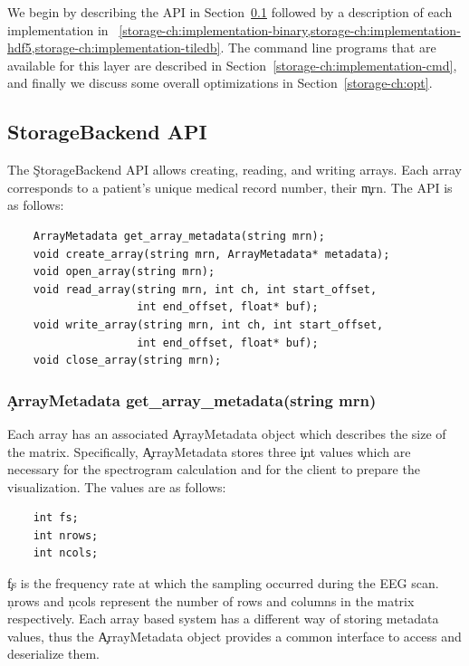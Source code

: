 We begin by describing the API in Section~\ref{storage-ch:api} followed by a
description of each implementation in
~\cref{storage-ch:implementation-binary,storage-ch:implementation-hdf5,storage-ch:implementation-tiledb}.
The command line programs that are available for this layer are described in
Section~\ref{storage-ch:implementation-cmd}, and finally we discuss some
overall optimizations in Section~\ref{storage-ch:opt}.

\subsection{StorageBackend API}\label{storage-ch:api}

The \c{StorageBackend} API allows creating, reading, and writing arrays. Each
array corresponds to a patient's unique medical record number, their \c{mrn}.
The API is as follows:

\begin{lstlisting}
    ArrayMetadata get_array_metadata(string mrn);
    void create_array(string mrn, ArrayMetadata* metadata);
    void open_array(string mrn);
    void read_array(string mrn, int ch, int start_offset,
                    int end_offset, float* buf);
    void write_array(string mrn, int ch, int start_offset,
                    int end_offset, float* buf);
    void close_array(string mrn);
\end{lstlisting}

\subsubsection{\c{ArrayMetadata get\_array\_metadata(string mrn)}}

Each array has an associated \c{ArrayMetadata} object which describes the size
of the matrix. Specifically, \c{ArrayMetadata} stores three \c{int} values which
are necessary for the spectrogram calculation and for the client to prepare the
visualization. The values are as follows:

\begin{lstlisting}
    int fs;
    int nrows;
    int ncols;
\end{lstlisting}

\c{fs} is the frequency rate at which the sampling occurred during the EEG
scan. \c{nrows} and \c{ncols} represent the number of rows and columns in the
matrix respectively. Each array based system has a different way of storing
metadata values, thus the \c{ArrayMetadata} object provides a common interface
to access and deserialize them.

